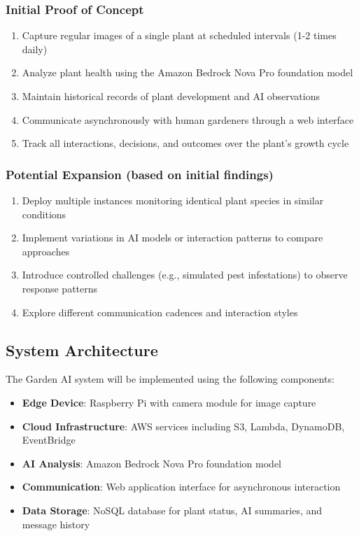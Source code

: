 \documentclass[12pt,letterpaper]{article}
\begin{document}
\subsubsection{Initial Proof of Concept}
\begin{enumerate}
    \item Capture regular images of a single plant at scheduled intervals (1-2 times daily)
    \item Analyze plant health using the Amazon Bedrock Nova Pro foundation model
    \item Maintain historical records of plant development and AI observations
    \item Communicate asynchronously with human gardeners through a web interface
    \item Track all interactions, decisions, and outcomes over the plant's growth cycle
\end{enumerate}

\subsubsection{Potential Expansion (based on initial findings)}
\begin{enumerate}
    \item Deploy multiple instances monitoring identical plant species in similar conditions
    \item Implement variations in AI models or interaction patterns to compare approaches
    \item Introduce controlled challenges (e.g., simulated pest infestations) to observe response patterns
    \item Explore different communication cadences and interaction styles
\end{enumerate}

\subsection{System Architecture}

The Garden AI system will be implemented using the following components:

\begin{itemize}
    \item \textbf{Edge Device}: Raspberry Pi with camera module for image capture
    \item \textbf{Cloud Infrastructure}: AWS services including S3, Lambda, DynamoDB, EventBridge
    \item \textbf{AI Analysis}: Amazon Bedrock Nova Pro foundation model
    \item \textbf{Communication}: Web application interface for asynchronous interaction
    \item \textbf{Data Storage}: NoSQL database for plant status, AI summaries, and message history
\end{itemize}
\end{document}
